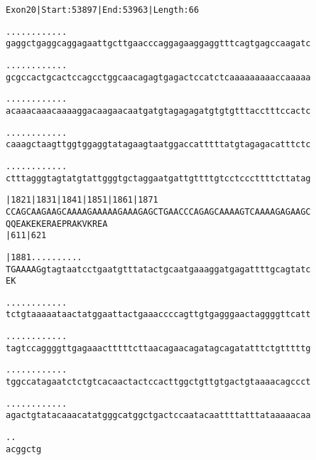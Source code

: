 \documentclass{article}
\begin{document}
\newpage
\begin{alltt}
Exon 20 | Start: 53897 | End: 53963 | Length: 66

.    .    .    .    .    .    .    .    .    .    .    .
gaggctgaggcaggagaattgcttgaacccaggagaaggaggtttcagtgagccaagatc



.    .    .    .    .    .    .    .    .    .    .    .
gcgccactgcactccagcctggcaacagagtgagactccatctcaaaaaaaaaccaaaaa



.    .    .    .    .    .    .    .    .    .    .    .
acaaacaaacaaaaggacaagaacaatgatgtagagagatgtgtgtttacctttccactc



.    .    .    .    .    .    .    .    .    .    .    .
caaagctaagttggtggaggtatagaagtaatggaccatttttatgtagagacatttctc



.    .    .    .    .    .    .    .    .    .    .    .
ctttagggtagtatgtattgggtgctaggaatgattgttttgtcctcccttttcttatag



|1821     |1831     |1841     |1851     |1861     |1871
CCAGCAAGAAGCAAAAGAAAAAGAAAGAGCTGAACCCAGAGCAAAAGTCAAAAGAGAAGC
 Q  Q  E  A  K  E  K  E  R  A  E  P  R  A  K  V  K  R  E  A
          |611                          |621

|1881      .    .    .    .    .    .    .    .    .    .
TGAAAAGgtagtaatcctgaatgtttatactgcaatgaaaggatgagattttgcagtatc
 E  K


 .    .    .    .    .    .    .    .    .    .    .    .
tctgtaaaaataactatggaattactgaaaccccagttgtgagggaactaggggttcatt



\end{alltt}
\newpage
\begin{alltt}
 .    .    .    .    .    .    .    .    .    .    .    .
tagtccaggggttgagaaactttttcttaacagaacagatagcagatatttctgtttttg



 .    .    .    .    .    .    .    .    .    .    .    .
tggccatagaatctctgtcacaactactccacttggctgttgtgactgtaaaacagccct



 .    .    .    .    .    .    .    .    .    .    .    .
agactgtatacaaacatatgggcatggctgactccaatacaattttatttataaaaacaa



 .    .
acggctg


\end{alltt}
\end{document}
